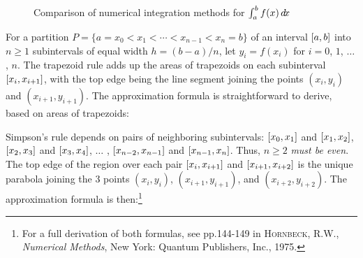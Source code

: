 \begin{figure}[ht]
{}
 \caption[]{\enskip Comparison of numerical integration methods for $\int_a^b f(x)\,d\!x$}
 \label{fig:nummethods}
\end{figure}

For a partition $P= \lbrace a=x_0 < x_1 < \cdots < x_{n-1} < x_n = b \rbrace$ of
an interval $\lbrack a,b \rbrack$ into $n \ge 1$ subintervals of equal width
$h = (b-a)/n$, let $y_i = f(x_i)$ for $i = 0$, $1$, $\ldots$, $n$.
The trapezoid rule adds up the areas of trapezoids on each subinterval
$\lbrack x_i,x_{i+1} \rbrack$, with the top edge being the line segment joining the
points $(x_i,y_i)$ and $(x_{i+1},y_{i+1})$. The approximation formula is
straightforward to derive, based on areas of trapezoids:


Simpson's rule depends on pairs of neighboring subintervals:
$\lbrack x_0,x_1 \rbrack$ and $\lbrack x_1,x_2 \rbrack$,
$\lbrack x_2,x_3 \rbrack$ and $\lbrack x_3,x_4 \rbrack$, $\ldots$ ,
$\lbrack x_{n-2},x_{n-1} \rbrack$ and $\lbrack x_{n-1},x_n \rbrack$.
Thus, $n \ge 2$ \emph{must be even}. The top edge of the region over each pair
$\lbrack x_{i},x_{i+1} \rbrack$ and $\lbrack x_{i+1},x_{i+2} \rbrack$ is the unique parabola
joining the 3 points $(x_i,y_i)$, $(x_{i+1},y_{i+1})$, and $(x_{i+2},y_{i+2})$.
The approximation formula is then:\footnote{For a full derivation of both
formulas, see pp.144-149 in \textsc{Hornbeck, R.W.}, \emph{Numerical Methods},
New York: Quantum Publishers, Inc., 1975.}

